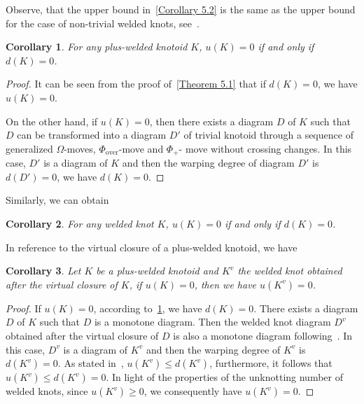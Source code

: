 \documentclass[11pt]{amsart}
\theoremstyle{noparens}
\newtheorem{corollary}{Corollary}[section]
\numberwithin{equation}{section}
\numberwithin{equation}{section}
\begin{document}
Observe, that the upper bound in~\cref{Corollary 5.2} is the same as the upper bound for the case of non-trivial welded knots, see~\citep[Proposition~2.4]{satoh2018crossing}.  

\begin{corollary} \label{Corollary 5.3}
For any  plus-welded knotoid $K$, $u(K)=0$ if and only if $d(K)=0$.
\end{corollary}

\begin{proof}
It can be seen from the proof of~\cref{Theorem 5.1} that if $d(K) = 0$, we have $u(K) = 0$. 

On the other hand, if $u(K) = 0$, then there exists a diagram $D$ of $K$ such that $D$ can be transformed into a diagram $D'$ of trivial knotoid through a sequence of generalized $\Omega$-moves, $\Phi_{\text{over}}$-move and $\Phi_+$- move without crossing changes. In this case, $D'$ is a diagram of $K$ and then the warping degree of diagram $D'$ is $d(D') = 0$, we have $d(K) = 0$.
\end{proof}

Similarly, we can obtain 

\begin{corollary} \label{Corollary 5.4}
For any welded knot $K$, $u(K)=0$ if and only if $d(K)=0$.
\end{corollary}

In reference to the virtual closure of a plus-welded  knotoid, we have 

\begin{corollary}	\label{Corollary 5.5}
Let $K$ be a plus-welded knotoid and $K^{v}$ the welded knot obtained after the virtual closure of $K$, if $u(K)=0$, then we have $u(K^{v})=0$.
\end{corollary} 

\begin{proof}
If $u(K) = 0$, according to~\cref{Corollary 5.3}, we  have $d(K) = 0$. There exists a diagram $D$ of $K$ such that $D$ is a monotone diagram. Then the welded knot diagram $D^{v}$ obtained after the virtual closure of $D$ is also a monotone diagram following~\citep{li2017unknotting}. In this case, $D^{v}$ is a diagram of $K^{v}$ and then the warping degree of $K^{v}$ is $d(K^{v})=0$.
As stated in~\citep{li2017unknotting}, $u(K^{v}) \leq d(K^{v})$, furthermore, it follows that $u(K^{v}) \leq d(K^{v}) = 0$. In light of the properties of the unknotting number of welded knots, since $u(K^{v})\geq 0$, we consequently have $u(K^{v}) = 0$.
\end{proof}
	
\end{document}
